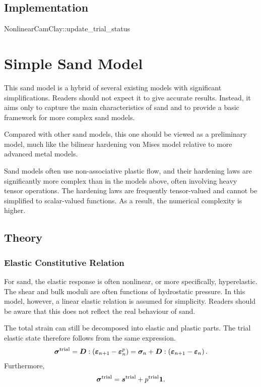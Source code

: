 \subsection{Implementation}
\begin{cppcode}
NonlinearCamClay::update_trial_status
\end{cppcode}
\section{Simple Sand Model}
This sand model is a hybrid of several existing models with significant simplifications.
Readers should not expect it to give accurate results.
Instead, it aims only to capture the main characteristics of sand and to provide a basic framework for more complex sand models.

Compared with other sand models, this one should be viewed as a preliminary model, much like the bilinear hardening von Mises model relative to more advanced metal models.

Sand models often use non-associative plastic flow, and their hardening laws are significantly more complex than in the models above, often involving heavy tensor operations.
The hardening laws are frequently tensor-valued and cannot be simplified to scalar-valued functions.
As a result, the numerical complexity is higher.
\subsection{Theory}
\subsubsection{Elastic Constitutive Relation}
For sand, the elastic response is often nonlinear, or more specifically, hyperelastic.
The shear and bulk moduli are often functions of hydrostatic pressure.
In this model, however, a linear elastic relation is assumed for simplicity.
Readers should be aware that this does not reflect the real behaviour of sand.

The total strain can still be decomposed into elastic and plastic parts.
The trial elastic state therefore follows from the same expression.
\begin{gather}\label{eq:ss_tsigma}
\bm{\sigma}^\text{trial}=\bm{D}:\left(\bm{\varepsilon}_{n+1}-\bm{\varepsilon}^p_n\right)=\bm{\sigma}_n+\bm{D}:\left(\bm{\varepsilon}_{n+1}-\bm{\varepsilon}_n\right).
\end{gather}
Furthermore,
\begin{gather}
\bm{\sigma}^\text{trial}=\bm{s}^\text{trial}+p^\text{trial}\bm{1}.
\end{gather}
